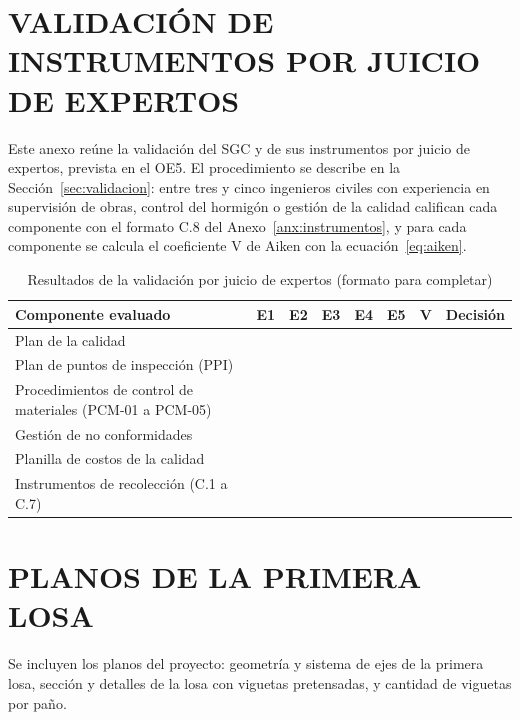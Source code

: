 \chapter{VALIDACIÓN DE INSTRUMENTOS POR JUICIO DE EXPERTOS}
\label{anx:validacion}
Este anexo reúne la validación del SGC y de sus instrumentos por juicio de expertos, prevista en el OE5. El procedimiento se describe en la Sección~\ref{sec:validacion}: entre tres y cinco ingenieros civiles con experiencia en supervisión de obras, control del hormigón o gestión de la calidad califican cada componente con el formato C.8 del Anexo~\ref{anx:instrumentos}, y para cada componente se calcula el coeficiente V de Aiken con la ecuación~\eqref{eq:aiken}.

\begin{table}[H]
\caption{Resultados de la validación por juicio de expertos (formato para completar)}
\label{tab:resultados-aiken}
\begin{tabularx}{\linewidth}{@{}P{5.8cm}CCCCCCC@{}}
\toprule
\textbf{Componente evaluado} & \textbf{E1} & \textbf{E2} & \textbf{E3} & \textbf{E4} & \textbf{E5} & \textbf{V} & \textbf{Decisión} \\
\midrule
Plan de la calidad & & & & & & & \\
Plan de puntos de inspección (PPI) & & & & & & & \\
Procedimientos de control de materiales (PCM-01 a PCM-05) & & & & & & & \\
Gestión de no conformidades & & & & & & & \\
Planilla de costos de la calidad & & & & & & & \\
Instrumentos de recolección (C.1 a C.7) & & & & & & & \\
\bottomrule
\end{tabularx}
\end{table}


\chapter{PLANOS DE LA PRIMERA LOSA}
Se incluyen los planos del proyecto: geometría y sistema de ejes de la primera losa, sección y detalles de la losa con viguetas pretensadas, y cantidad de viguetas por paño.




